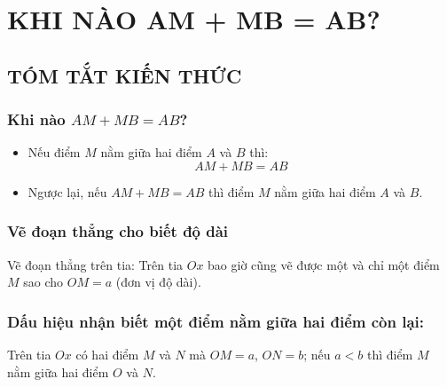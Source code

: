 \section{KHI NÀO AM + MB = AB? }
\subsection{TÓM TẮT KIẾN THỨC}
\begin{tomtat}
	\subsubsection{Khi nào $AM + MB = AB$?}
\begin{itemize}
\item Nếu điểm $M$ nằm giữa hai điểm $A$ và $B$ thì: $$AM + MB = AB$$
\item Ngược lại, nếu $AM + MB = AB$ thì điểm $M$ nằm giữa hai điểm $A$ và $B$.
\end{itemize}
	\subsubsection{Vẽ đoạn thẳng cho biết độ dài}
Vẽ đoạn thẳng trên tia:
Trên tia $Ox$ bao giờ cũng vẽ được một và chỉ một điểm $M$ sao cho $OM = a$ (đơn vị độ dài).
	\subsubsection{Dấu hiệu nhận biết một điểm nằm giữa hai điểm còn lại:}
Trên tia $Ox$ có hai điểm $M$ và $N$ mà $OM = a$, $ON = b$; nếu $a < b$ thì điểm $M$ nằm giữa hai điểm $O$ và $N$.
\end{tomtat}
